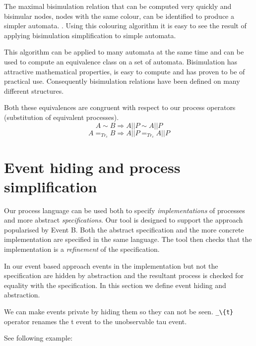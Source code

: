 \documentclass[]{article}
\begin{document}
 The maximal bisimulation relation that  can be computed very quickly and  bisimular nodes, nodes with the same colour, can be identified to produce a simpler automata. . 
 Using this colouring algorithm it is easy to see the result of applying  bisimulation simplification to simple automata.
 
 This algorithm can be applied to many automata at the same time and can be used to compute an equivalence   class on a set of   automata.
 Bisimulation has  attractive mathematical properties, is easy to compute and has proven to be of practical use. Consequently bisimulation relations have been defined on many different structures.
 
Both these equivalences are congruent with respect to our process operators (substitution of equivalent processes).
\[ A\sim B \Rightarrow A||P\sim A||P\]
\[ A =_{Tr_{c}}  B  \Rightarrow  A||P =_{Tr_{c}}  A||P\]
 
\section{Event hiding and process simplification}
Our process language can be used both to specify \emph{implementations}  of  processes and more abstract \emph{specifications}.  Our tool is designed to support the approach popularised by Event B. Both the abstract specification and the more concrete implementation are specified in the same language.  The tool then checks that the implementation is a \emph{refinement} of the specification.

In our event based approach events in the implementation but not the specification are hidden by abstraction and the resultant process is checked for equality with the specification.  In this section we define event hiding and abstraction.



We can make events private  by  hiding them so they can not be seen.  \verb|_\{t}| operator renames the {\sf t} event to the unobservable  {\sf tau} event.

See following example:
\end{document}
